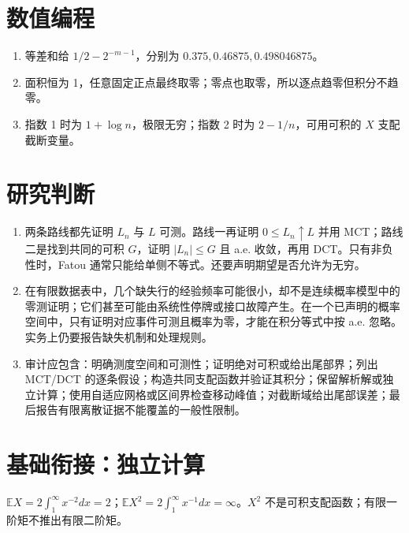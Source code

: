 \section*{数值编程}
\begin{enumerate}[leftmargin=*]
  \item 等差和给 $1/2-2^{-m-1}$，分别为 $0.375,0.46875,0.498046875$。
  \item 面积恒为 1，任意固定正点最终取零；零点也取零，所以逐点趋零但积分不趋零。
  \item 指数 1 时为 $1+\log n$，极限无穷；指数 2 时为 $2-1/n$，可用可积的 $X$ 支配截断变量。
\end{enumerate}

\section*{研究判断}

\begin{enumerate}[leftmargin=*]
  \item 两条路线都先证明 $L_n$ 与 $L$ 可测。路线一再证明 $0\leq L_n\uparrow L$ 并用 MCT；路线二是找到共同的可积 $G$，证明 $|L_n|\leq G$ 且 a.e. 收敛，再用 DCT。只有非负性时，Fatou 通常只能给单侧不等式。还要声明期望是否允许为无穷。
  \item 在有限数据表中，几个缺失行的经验频率可能很小，却不是连续概率模型中的零测证明；它们甚至可能由系统性停牌或接口故障产生。在一个已声明的概率空间中，只有证明对应事件可测且概率为零，才能在积分等式中按 a.e. 忽略。实务上仍要报告缺失机制和处理规则。
  \item 审计应包含：明确测度空间和可测性；证明绝对可积或给出尾部界；列出 MCT/DCT 的逐条假设；构造共同支配函数并验证其积分；保留解析解或独立计算；使用自适应网格或区间界检查移动峰值；对截断域给出尾部误差；最后报告有限离散证据不能覆盖的一般性限制。
\end{enumerate}

\section*{基础衔接：独立计算}
$\mathbb EX=2\int_1^\infty x^{-2}dx=2$；$\mathbb EX^2=2\int_1^\infty x^{-1}dx=\infty$。$X^2$ 不是可积支配函数；有限一阶矩不推出有限二阶矩。
